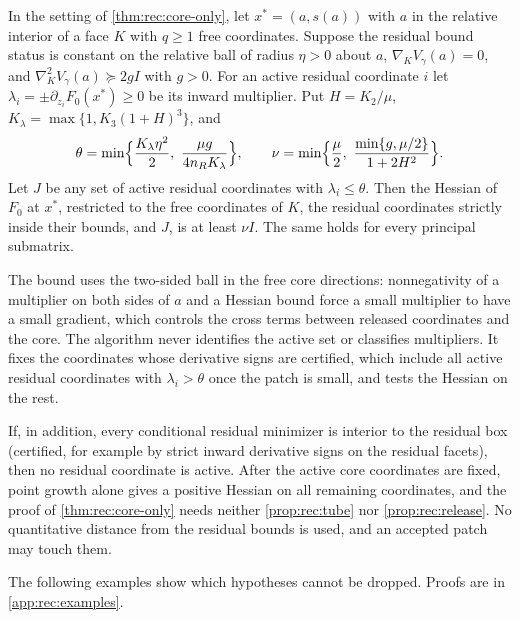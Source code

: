 \begin{proposition}\label{prop:rec:release}
In the setting of \cref{thm:rec:core-only}, let $x^*=(a,s(a))$ with $a$ in
the relative interior of a face $K$ with $q\ge1$ free coordinates. Suppose the
residual bound status is constant on the relative ball of radius $\eta>0$
about $a$, $\nabla_KV_\gamma(a)=0$, and $\nabla_K^2V_\gamma(a)\succeq2gI$
with $g>0$. For an active residual coordinate $i$ let
$\lambda_i=\pm\partial_{z_i}F_0(x^*)\ge0$ be its inward multiplier. Put
$H=K_2/\mu$, $K_\lambda=\max\{1,K_3(1+H)^3\}$, and
\[
 \theta=\min\Bigl\{\frac{K_\lambda\eta^2}2,\ \frac{\mu g}{4n_RK_\lambda}\Bigr\},
 \qquad
 \nu=\min\Bigl\{\frac\mu2,\ \frac{\min\{g,\mu/2\}}{1+2H^2}\Bigr\}.
\]
Let $J$ be any set of active residual coordinates with $\lambda_i\le\theta$.
Then the Hessian of $F_0$ at $x^*$, restricted to the free coordinates of
$K$, the residual coordinates strictly inside their bounds, and $J$, is at
least $\nu I$. The same holds for every principal submatrix.
\end{proposition}

The bound uses the two-sided ball in the free core directions: nonnegativity
of a multiplier on both sides of $a$ and a Hessian bound force a small
multiplier to have a small gradient, which controls the cross terms between
released coordinates and the core. The algorithm never identifies the
active set or classifies multipliers. It fixes the coordinates whose
derivative signs are certified, which include all active residual
coordinates with $\lambda_i>\theta$ once the patch is small, and tests the
Hessian on the rest.

\begin{remark}\label{rem:rec:interior}
If, in addition, every conditional residual minimizer is interior to the
residual box (certified, for example by strict inward derivative signs on the
residual facets), then no residual coordinate is active. After the active
core coordinates are fixed, point growth alone gives a positive Hessian on
all remaining coordinates, and the proof of \cref{thm:rec:core-only}
needs neither \cref{prop:rec:tube} nor \cref{prop:rec:release}. No
quantitative distance from the residual bounds is used, and an accepted
patch may touch them.
\end{remark}

The following examples show which hypotheses cannot be dropped. Proofs are
in \cref{app:rec:examples}.

